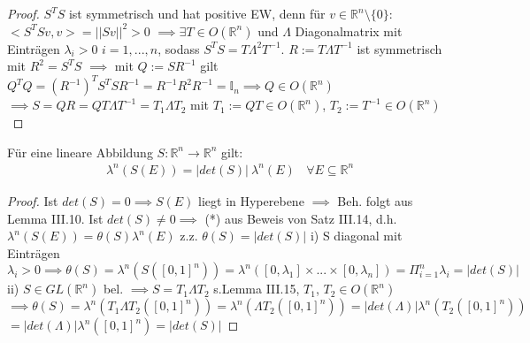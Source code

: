 \documentclass[11pt,a4paper,fleqn,openany]{report}
\begin{document}
    \begin{proof}
      $S^T S$ ist symmetrisch und hat positive EW, denn für \newline $v\in\mathbb{R}^n\setminus\{0\}:$ $<S^T Sv,v > = ||Sv||^2 > 0$ \newline
      $\implies \exists T\in O(\mathbb{R}^n)$ und $\Lambda$ Diagonalmatrix mit Einträgen $\lambda_i > 0$ $i=1,...,n$, sodass $S^T S = T \Lambda^2 T^{-1}$. \newline
      $R := T \Lambda T^{-1}$ ist symmetrisch mit $R^2 = S^T S$ $\implies$ mit $Q := S R^{-1}$ gilt \newline
      $Q^T Q = (R^{-1})^T S^T S R^{-1} = R^{-1} R^2 R^{-1} = \mathbb{I}_n \implies Q \in O(\mathbb{R}^n)$ \newline
      $\implies S = Q R = Q T \Lambda T^{-1} = T_1 \Lambda T_2$ mit $T_1 := Q T \in O(\mathbb{R}^n)$, $T_2 := T^{-1} \in O(\mathbb{R}^n)$
    \end{proof}

    \begin{theorem}
      Für eine lineare Abbildung $S: \mathbb{R}^n \to \mathbb{R}^n$ gilt:
      \begin{align*}
        \lambda^n(S(E)) = |det(S)| \ \lambda^n(E) \ \ \ \ \forall E \subseteq \mathbb{R}^n
      \end{align*}
    \end{theorem}

    \begin{proof}
      Ist $det(S) = 0 \implies S(E)$ liegt in Hyperebene $\implies$ Beh. folgt aus Lemma III.10. \newline
      Ist $det(S) \neq 0 \implies$ (*) aus Beweis von Satz III.14, d.h. $\lambda^n(S(E)) = \theta(S) \lambda^n(E)$ \newline
      z.z. $\theta(S) = |det(S)|$ \newline
      i) S diagonal mit Einträgen $\lambda_i > 0 \implies \theta(S) = \lambda^n(S([0,1]^n)) = \lambda^n([0,\lambda_1]\times ... \times [0,\lambda_n])= \Pi_{i=1}^{n} \lambda_i = |det(S)|$ \newline 
      ii) $S\in GL(\mathbb{R}^n)$ bel. $\implies S = T_1 \Lambda T_2$ s.Lemma III.15, $T_1$, $T_2 \in O(\mathbb{R}^n)$ \newline
      $\implies \theta(S) = \lambda^n(T_1\Lambda T_2([0,1]^n)) = \lambda^n(\Lambda T_2([0,1]^n)) = |det(\Lambda)| \lambda^n(T_2([0,1]^n))$ \newline $= |det(\Lambda)| \lambda^n([0,1]^n) = |det(S)|$
    \end{proof}
\end{document}
